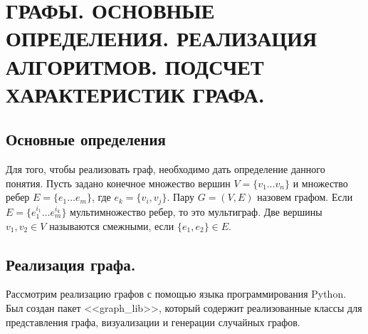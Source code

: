 \section{ГРАФЫ. ОСНОВНЫЕ ОПРЕДЕЛЕНИЯ. РЕАЛИЗАЦИЯ  АЛГОРИТМОВ. ПОДСЧЕТ ХАРАКТЕРИСТИК ГРАФА.}
\subsection{Основные определения}
Для того, чтобы реализовать граф, необходимо 
дать определение данного понятия. 
Пусть задано конечное множество вершин $V = \{v_1 \dots v_{n}\}$
и множество ребер $E = \{e_{1} \dots e_{m}\}$,
где $e_{k} = \{v_{i},v_{j}\}$. Пару $G = (V,E)$ назовем графом.
Если  $E = \{e_1^{i_1} \dots e_{m}^{i_{k}}\}$ мультимножество ребер,
то это мультиграф. Две вершины $v_1,v_2 \in V$ называются
смежными, если $\{e_1,e_2\} \in E$.
\subsection{Реализация графа.}
Рассмотрим реализацию графов с помощью языка программирования Python.
Был создан пакет <<graph\_lib>>, который содержит
реализованные классы для представления графа, визуализации и 
генерации случайных графов.

